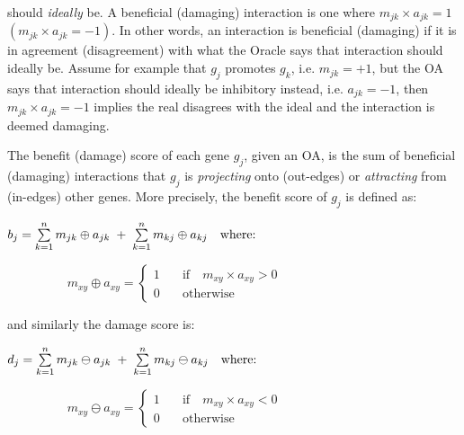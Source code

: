 should \textit{ideally} be. A beneficial (damaging) interaction is one where $m_{jk} \times a_{jk} = 1 $ $(m_{jk}\times a_{jk}=-1)$. In other words, an interaction is beneficial (damaging) if it is in agreement (disagreement) with what the Oracle says that interaction should ideally be. Assume for example that $g_j$ promotes $g_k$, i.e. $m_{jk}=+1$, but the OA says that interaction should ideally be inhibitory instead, i.e. $a_{jk}=-1$, then $m_{jk}\times a_{jk}=-1$ implies the real disagrees with the ideal and the interaction is deemed damaging. 

        The benefit (damage) score of each gene $g_j$, given an OA, is the sum of beneficial (damaging) interactions that $g_j$ is \textit{projecting} onto (out-edges) or \textit{attracting} from (in-edges) other genes. More precisely, the benefit score of $g_j$ is defined as:

		$b_j = \sum\limits_{k=1}^{n} m_{jk} \oplus a_{jk} \hspace{0.1cm}+\hspace{0.1cm} \sum\limits_{k=1}^{n} m_{kj} \oplus a_{kj} \quad\textrm{where:}$

		$\hspace{2cm}m_{xy} \oplus a_{xy}  =	\scriptscriptstyle{\begin{cases}	%
											1 & \quad\textrm{if}\quad m_{xy} \times a_{xy} >0 \\
											0 & \quad\textrm{otherwise}
									\end{cases}
									}$

		and similarly the damage score is:

		$d_j = \sum\limits_{k=1}^{n} m_{jk} \ominus a_{jk} \hspace{0.1cm}+\hspace{0.1cm} \sum\limits_{k=1}^{n} m_{kj} \ominus a_{kj} \quad\textrm{where:}$

		$\hspace{2cm}m_{xy} \ominus a_{xy}  = \scriptscriptstyle{\begin{cases}	%
											1 & \quad\textrm{if}\quad m_{xy} \times a_{xy} < 0 \\
											0 & \quad\textrm{otherwise}
									\end{cases}
									}$

